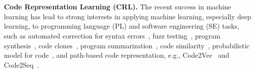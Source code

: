 \section{\color{red}{Related Work}}
\textbf{Code Representation Learning (CRL).}  The recent success in
machine learning has lead to strong interests in applying machine
learning, especially deep learning, to programming language (PL) and
software engineering (SE) tasks, such as automated correction for
syntax errors~\cite{Bhatia-2016}, fuzz testing~\cite{Patra-2016},
program synthesis~\cite{Amodio-2017}, code
clones~\cite{White-2016,Smith-2009,Li-2017}, program
summarization~\cite{Allamanis-2016,Mou-2014}, code
similarity~\cite{Zhao-2018,Alon-2018}, probabilistic model for
code~\cite{Bielik-2016}, and path-based code representation,
e.g., Code2Vec~\cite{Alon-2018} and Code2Seq~\cite{alon2018code2seq}. 




